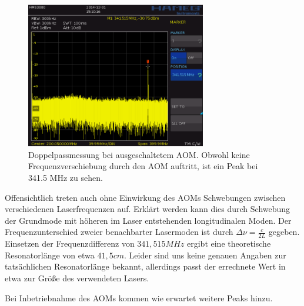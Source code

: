 \documentclass[bigchapter,colorback,accentcolor=tud4b,linedtoc,11pt]{tudreport}
\begin{document}
\begin{figure}[H]
  \centering
     \includegraphics[width=0.7\textwidth]{data/Aufgabe6/aom_aus.png}
  \caption[Cap for listoffigures]{Doppelpassmessung bei ausgeschaltetem AOM\@. Obwohl keine Frequenzverschiebung durch den AOM auftritt, ist ein Peak bei 341.5 MHz zu sehen.\cite{AndereGruppe}}
  \label{fig:Bild4}
\end{figure}

Offensichtlich treten auch ohne Einwirkung des AOMs Schwebungen zwischen verschiedenen Laserfrequenzen auf. Erklärt werden kann dies durch Schwebung der Grundmode mit höheren im Laser entstehenden longitudinalen Moden. Der Frequenzunterschied zweier benachbarter Lasermoden ist durch $\Delta \nu = \frac{c}{2L}$ gegeben. Einsetzen der Frequenzdifferenz von $341,515 MHz$ ergibt eine theoretische Resonatorlänge von etwa $41,5 cm$. Leider sind uns keine genauen Angaben zur tatsächlichen Resonatorlänge bekannt, allerdings passt der errechnete Wert in etwa zur Größe des verwendeten Lasers.

Bei Inbetriebnahme des AOMs kommen wie erwartet weitere Peaks hinzu.
\end{document}
